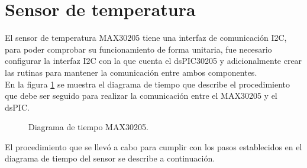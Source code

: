 \newpage
\section{Sensor de temperatura}

El sensor de temperatura MAX30205 tiene una interfaz de comunicación I2C, para poder comprobar su funcionamiento de forma unitaria, fue necesario configurar la interfaz I2C con la que cuenta el dsPIC30205 y adicionalmente crear las rutinas para mantener la comunicación entre ambos componentes.\\

En la figura \ref{fig:DiagramaMAX30205} se muestra el diagrama de tiempo que describe el procedimiento que debe ser seguido para realizar la comunicación entre el MAX30205 y el dsPIC.\\


\begin{figure}[htbp!]
	\centering
	\caption{Diagrama de tiempo MAX30205.}
	\label{fig:DiagramaMAX30205}
\end{figure}

El procedimiento que se llevó a cabo para cumplir con los pasos establecidos en el diagrama de tiempo del sensor se describe a continuación.

